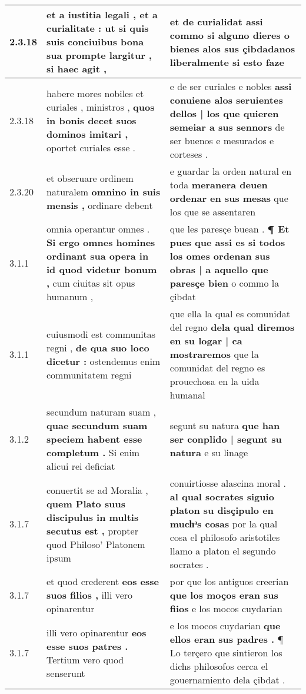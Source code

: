 \begin{tabular}{|p{1cm}|p{6.5cm}|p{6.5cm}|}
2.3.18 & et a iustitia legali , et a curialitate : \textbf{ ut si quis suis conciuibus bona sua prompte largitur , } si haec agit , & et de curialidat \textbf{ assi commo si alguno dieres o bienes alos sus çibdadanos liberalmente } si esto faze \\\hline
2.3.18 & habere mores nobiles et curiales , ministros , \textbf{ quos in bonis decet suos dominos imitari , } oportet curiales esse . & e de ser curiales e nobles \textbf{ assi conuiene alos seruientes dellos | los que quieren semeiar a sus sennors } de ser buenos e mesurados e corteses . \\\hline
2.3.20 & et obseruare ordinem naturalem \textbf{ omnino in suis mensis , } ordinare debent & e guardar la orden natural en toda \textbf{ meranera deuen ordenar en sus mesas } que los que se assentaren \\\hline
3.1.1 & omnia operantur omnes . \textbf{ Si ergo omnes homines ordinant sua opera in id quod videtur bonum , } cum ciuitas sit opus humanum , & que les paresçe buean . \textbf{ ¶ Et pues que assi es si todos los omes ordenan sus obras | a aquello que paresçe bien } o commo la çibdat \\\hline
3.1.1 & cuiusmodi est communitas regni , \textbf{ de qua suo loco dicetur : } ostendemus enim communitatem regni & que ella la qual es comunidat del regno \textbf{ dela qual diremos en su logar | ca mostraremos } que la comunidat del regno es prouechosa en la uida humanal \\\hline
3.1.2 & secundum naturam suam , \textbf{ quae secundum suam speciem habent esse completum . } Si enim alicui rei deficiat & segunt su natura \textbf{ que han ser conplido | segunt su natura } e su linage \\\hline
3.1.7 & conuertit se ad Moralia , \textbf{ quem Plato suus discipulus in multis secutus est , } propter quod Philoso’ Platonem ipsum & conuirtiosse alascina moral . \textbf{ al qual socrates siguio platon su disçipulo en muchͣs cosas } por la qual cosa el philosofo aristotiles llamo a platon el segundo socrates . \\\hline
3.1.7 & et quod crederent \textbf{ eos esse suos filios , } illi vero opinarentur & por que los antiguos creerian \textbf{ que los moços eran sus fiios } e los mocos cuydarian \\\hline
3.1.7 & illi vero opinarentur \textbf{ eos esse suos patres . } Tertium vero quod senserunt & e los mocos cuydarian \textbf{ que ellos eran sus padres . } ¶ Lo terçero que sintieron los dichs philosofos cerca el gouernamiento dela çibdat . \\\hline

\end{tabular}
